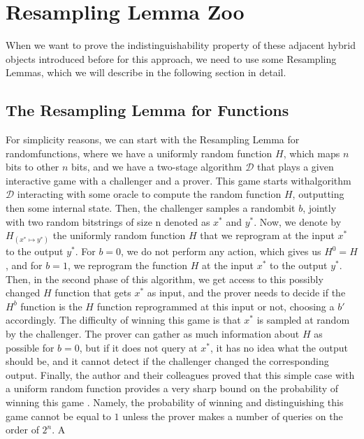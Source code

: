\documentclass[12pt]{article}
\begin{document}
    
    \section{Resampling Lemma Zoo}
    \label{sec:resampling-lemma-zoo}

    When we want to prove the indistinguishability property of these adjacent hybrid objects introduced before for this approach, we need to use some Resampling Lemmas, which we will describe in the following section in detail.

    
    \subsection{The Resampling Lemma for Functions}
    \label{subsec:resampling-lemma-functions}

    For simplicity reasons, we can start with the Resampling Lemma for random\break functions, where we have a uniformly random function $H$, which maps $n$ bits to other $n$ bits, and we have a two-stage algorithm $\mathcal{D}$ that plays a given interactive game with a challenger and a prover. This game starts with\break algorithm $\mathcal{D}$ interacting with some oracle to compute the random function $H$, outputting then some internal state. Then, the challenger samples a random\break bit $b$, jointly with two random bitstrings of size n denoted as ${x}^{*}$ and ${y}^{*}$. Now, we denote by ${H}_{({x}^{*} \mapsto {y}^{*})}$ the uniformly random function $H$ that we reprogram at the input ${x}^{*}$ to the output ${y}^{*}$. For $b = 0$, we do not perform any action, which gives us ${H}^{0} = H$, and for $b = 1$, we reprogram the function $H$ at the input ${x}^{*}$ to the output ${y}^{*}$. Then, in the second phase of this algorithm, we get access to this possibly changed $H$ function that gets ${x}^{*}$ as input, and the prover needs to decide if the ${H}^{b}$ function is the $H$ function reprogrammed at this input or not, choosing a $b'$ accordingly. The difficulty of winning this game is that ${x}^{*}$ is sampled at random by the challenger. The prover can gather as much information about $H$ as possible for $b = 0$, but if it does not query at ${x}^{*}$, it has no idea what the output should be, and it cannot detect if the challenger changed the corresponding output. Finally, the author and their colleagues proved that this simple case with a uniform random function provides a very sharp bound on the probability of winning this game \cite{grilo-hovelmanns-hulsing-majenz:tight-adaptive-reprogramming-qrom:2021:03-2024}. Namely, the probability of winning and distinguishing this game cannot be equal to $1$ unless the prover makes a number of queries on the order of ${2}^{n}$. A \break
    
\end{document}
